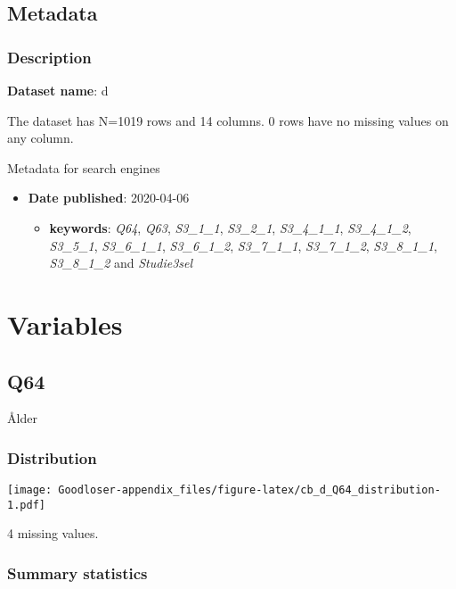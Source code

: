 \documentclass[
]{book}
\providecommand{\tightlist}{%
  \setlength{\itemsep}{0pt}\setlength{\parskip}{0pt}}
\begin{document}
\hypertarget{metadata}{%
\subsection{Metadata}\label{metadata}}

\hypertarget{description}{%
\subsubsection{Description}\label{description}}

\textbf{Dataset name}: d

The dataset has N=1019 rows and 14 columns.
0 rows have no missing values on any column.

Metadata for search engines

\begin{itemize}
\item
  \textbf{Date published}: 2020-04-06

  \begin{itemize}
  \tightlist
  \item
    \textbf{keywords}: \emph{Q64}, \emph{Q63}, \emph{S3\_1\_1}, \emph{S3\_2\_1}, \emph{S3\_4\_1\_1}, \emph{S3\_4\_1\_2}, \emph{S3\_5\_1}, \emph{S3\_6\_1\_1}, \emph{S3\_6\_1\_2}, \emph{S3\_7\_1\_1}, \emph{S3\_7\_1\_2}, \emph{S3\_8\_1\_1}, \emph{S3\_8\_1\_2} and \emph{Studie3sel}
  \end{itemize}
\end{itemize}

\hypertarget{variables}{%
\section{Variables}\label{variables}}

\hypertarget{Q64}{%
\subsection{Q64}\label{Q64}}

Ålder

\hypertarget{Q64_distribution}{%
\subsubsection{Distribution}\label{Q64_distribution}}

\texttt{[image: Goodloser-appendix\_files/figure-latex/cb\_d\_Q64\_distribution-1.pdf]}

4 missing values.

\hypertarget{Q64_summary}{%
\subsubsection{Summary statistics}\label{Q64_summary}}
\end{document}
